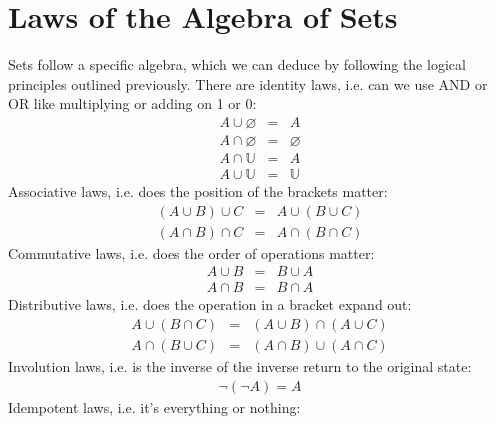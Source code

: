 \documentclass[letterpaper,10pt,english]{jupyterBook}
\begin{document}
\section{Laws of the Algebra of Sets}
\label{\detokenize{ProofLogic/setsnotation:laws-of-the-algebra-of-sets}}
\sphinxAtStartPar
Sets follow a specific algebra, which we can deduce by following the logical principles outlined previously. There are identity laws, i.e. can we
use AND or OR like multiplying or adding on 1 or 0:
\begin{equation*}
\begin{split}A \cup \varnothing &=& A \\
A \cap \varnothing &=& \varnothing \\
A \cap \mathbb{U} &=& A \\
A \cup \mathbb{U} &=& \mathbb{U}\end{split}
\end{equation*}
\sphinxAtStartPar
Associative laws, i.e. does the position of the brackets matter:
\begin{equation*}
\begin{split}(A \cup B) \cup C &=&  A \cup (B \cup C)\\
(A \cap B) \cap C &=&  A \cap (B \cap C)\end{split}
\end{equation*}
\sphinxAtStartPar
Commutative laws, i.e. does the order of operations matter:
\begin{equation*}
\begin{split}A \cup B &=& B \cup A \\
A \cap B &=& B \cap A\end{split}
\end{equation*}
\sphinxAtStartPar
Distributive laws, i.e. does the operation in a bracket expand out:
\begin{equation*}
\begin{split}A \cup (B \cap C) &=& (A\cup B) \cap (A \cup C)\\
A \cap (B \cup C) &=& (A\cap B) \cup (A \cap C)\end{split}
\end{equation*}
\sphinxAtStartPar
Involution laws, i.e. is the inverse of the inverse return to the original state:
\begin{equation*}
\begin{split}\neg(\neg A) = A\end{split}
\end{equation*}
\sphinxAtStartPar
Idempotent laws, i.e. it’s everything or nothing:
\end{document}
